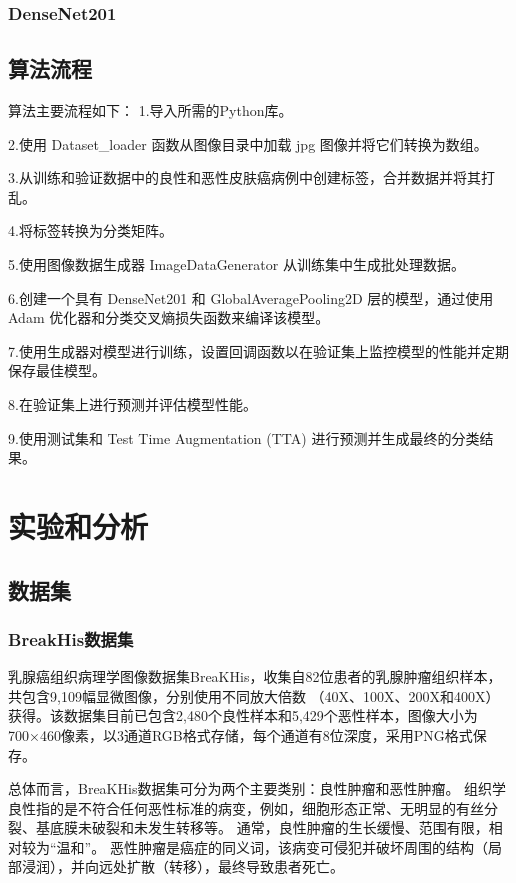 \documentclass[AutoFakeBold]{LZUThesis}
\begin{document}
\subsection{DenseNet201}

\section{算法流程}

算法主要流程如下：
1.导入所需的Python库。

2.使用 Dataset_loader 函数从图像目录中加载 jpg 图像并将它们转换为数组。

3.从训练和验证数据中的良性和恶性皮肤癌病例中创建标签，合并数据并将其打乱。

4.将标签转换为分类矩阵。

5.使用图像数据生成器 ImageDataGenerator 从训练集中生成批处理数据。

6.创建一个具有 DenseNet201 和 GlobalAveragePooling2D 层的模型，通过使用 Adam 优化器和分类交叉熵损失函数来编译该模型。

7.使用生成器对模型进行训练，设置回调函数以在验证集上监控模型的性能并定期保存最佳模型。

8.在验证集上进行预测并评估模型性能。

9.使用测试集和 Test Time Augmentation (TTA) 进行预测并生成最终的分类结果。


\chapter{实验和分析}
\section{数据集}
\subsection{BreakHis数据集}
乳腺癌组织病理学图像数据集BreaKHis，收集自82位患者的乳腺肿瘤组织样本，共包含9,109幅显微图像，分别使用不同放大倍数
（40X、100X、200X和400X）获得。该数据集目前已包含2,480个良性样本和5,429个恶性样本，图像大小为700×460像素，以3通道RGB格式存储，每个通道有8位深度，采用PNG格式保存。

总体而言，BreaKHis数据集可分为两个主要类别：良性肿瘤和恶性肿瘤。
组织学良性指的是不符合任何恶性标准的病变，例如，细胞形态正常、无明显的有丝分裂、基底膜未破裂和未发生转移等。
通常，良性肿瘤的生长缓慢、范围有限，相对较为“温和”。
恶性肿瘤是癌症的同义词，该病变可侵犯并破坏周围的结构（局部浸润），并向远处扩散（转移），最终导致患者死亡。
\end{document}
